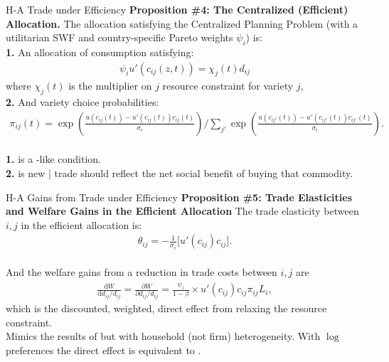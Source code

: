 \documentclass[9pt,pdftex,aspectratio=1610]{beamer}
\theoremstyle{definition}
\begin{document}

\begin{frame}[t]{H-A Trade under Efficiency}
\smallskip
\textbf{Proposition \#4: The Centralized (Efficient) Allocation.} The allocation satisfying the Centralized Planning Problem (with a utilitarian SWF and country-specific Pareto weights $\psi_i$) is:\\
\bigskip
\textbf{1.} An allocation of consumption satisfying:
\begin{align}
\psi_{i} u'(c_{ij}(z,t) ) = \chi_{j}(t) d_{ij} \nonumber
\end{align}
where $\chi_{j}(t)$ is the multiplier on $j$ resource constraint for variety $j$,\\
\bigskip
\medskip
\textbf{2.} And variety choice probabilities:
\begin{align}
\displaystyle \pi_{ij}(t) =\exp \left( \frac{u(c_{ij}(t)) - u'(c_{ij}(t))c_{ij}(t)}{\sigma_{\epsilon}}\right) \bigg / \sum_{j'}\exp \left( \frac{u(c_{ij'}(t)) - u'(c_{ij'}(t))c_{ij'}(t)}{\sigma_{\epsilon}} \right). \nonumber
\end{align}\\
\bigskip
\medskip
\textbf{1.} is a \citet{backus1993}-like condition. \\
\smallskip
\textbf{2.} is new | trade should reflect the net social benefit of buying that commodity.
\end{frame}

\begin{frame}[t]{H-A Gains from Trade under Efficiency}
\smallskip
\textbf{Proposition \#5: Trade Elasticities and Welfare Gains in the Efficient Allocation} The trade elasticity between $i,j$ in the efficient allocation is:
\begin{align}
\theta_{ij} =  -\frac{1}{\sigma_{\epsilon}} \bigg [ u'(c_{ij}) c_{ij} \bigg]. \nonumber
\end{align}\\
\bigskip
And the welfare gains from a reduction in trade costs between $i,j$ are
\begin{align}
\frac{\mathrm{d} W}{\mathrm{d} d_{ij} / d_{ij}} = \frac{\partial W}{\partial d_{ij} / d_{ij}} = \frac{\psi_{i}}{1-\beta} \times u'(c_{ij}) c_{ij} \pi_{ij} L_i, \nonumber
\end{align}
which is the discounted, weighted, direct effect from relaxing the resource constraint.\\
\bigskip
\medskip
Mimics the results of \citet{AtkesonBurstein2010} but with household (not firm) heterogeneity. With $\log$ preferences the direct effect is equivalent to \citet{arkolakis2012new}.\\
\bigskip

\end{frame}
\end{document}
